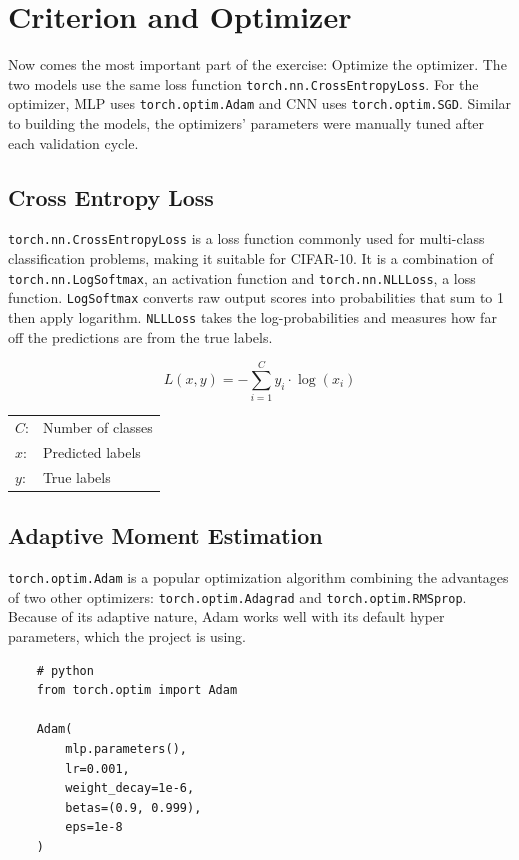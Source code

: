 \documentclass{report}
\begin{document}
\section{Criterion and Optimizer}
Now comes the most important part of the exercise: Optimize the optimizer. The two models use the same loss 
function \texttt{torch.nn.CrossEntropyLoss}. For the optimizer, MLP uses \texttt{torch.optim.Adam} and CNN 
uses \texttt{torch.optim.SGD}. Similar to building the models, the optimizers' parameters were manually 
tuned after each validation cycle.

\subsection{Cross Entropy Loss}
\texttt{torch.nn.CrossEntropyLoss} is a loss function commonly used for multi-class classification problems, making 
it suitable for CIFAR-10. It is a combination of \texttt{torch.nn.LogSoftmax}, an activation function and 
\texttt{torch.nn.NLLLoss}, a loss function. \texttt{LogSoftmax} converts raw output scores into probabilities that sum to 
1 then apply logarithm. \texttt{NLLLoss} takes the log-probabilities and measures how far off the predictions are from 
the true labels. 

\[ L(x, y) = - \sum_{i=1}^{C} y_i \cdot \log(x_i) \]

\begin{center}
    \begin{tabular}{ll}
        $C$: & Number of classes  \\    
        $x$: & Predicted labels   \\
        $y$: & True labels        \\
    \end{tabular}
\end{center}

\subsection{Adaptive Moment Estimation}
\texttt{torch.optim.Adam} is a popular optimization algorithm combining the advantages of two other optimizers: 
\texttt{torch.optim.Adagrad} and \texttt{torch.optim.RMSprop}. Because of its adaptive nature, Adam works well 
with its default hyper parameters, which the project is using.

\begin{verbatim}
    # python
    from torch.optim import Adam

    Adam(
        mlp.parameters(),
        lr=0.001,
        weight_decay=1e-6,
        betas=(0.9, 0.999),
        eps=1e-8
    )
\end{verbatim}
\end{document}
